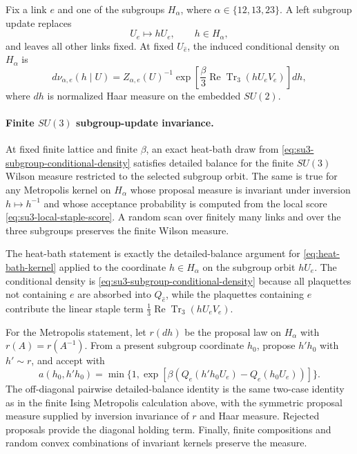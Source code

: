 Fix a link \(e\) and one of the subgroups \(H_\alpha\), where
\(\alpha\in\{12,13,23\}\).  A left subgroup update replaces
\[
  U_e\longmapsto hU_e,\qquad h\in H_\alpha,
\]
and leaves all other links fixed.  At fixed \(U_{\widehat e}\), the induced
conditional density on \(H_\alpha\) is
\begin{equation}
  d\nu_{\alpha,e}(h\mid U)
  =
  Z_{\alpha,e}(U)^{-1}
  \exp\!\left[
    \frac{\beta}{3}
    \operatorname{Re}\operatorname{Tr}_3(hU_eV_e)
  \right]dh,
  \label{eq:su3-subgroup-conditional-density}
\end{equation}
where \(dh\) is normalized Haar measure on the embedded \(SU(2)\).

\paragraph{Finite \(SU(3)\) subgroup-update invariance.}
At fixed finite lattice and finite \(\beta\), an exact heat-bath draw from
\eqref{eq:su3-subgroup-conditional-density} satisfies detailed balance for the
finite \(SU(3)\) Wilson measure restricted to the selected subgroup orbit.
The same is true for any Metropolis kernel on \(H_\alpha\) whose proposal
measure is invariant under inversion \(h\mapsto h^{-1}\) and whose acceptance
probability is computed from the local score
\eqref{eq:su3-local-staple-score}.  A random scan over finitely many links and
over the three subgroups preserves the finite Wilson measure.

The heat-bath statement is exactly the detailed-balance argument for
\eqref{eq:heat-bath-kernel} applied to the coordinate \(h\in H_\alpha\) on
the subgroup orbit \(hU_e\).  The conditional
density is \eqref{eq:su3-subgroup-conditional-density} because all plaquettes
not containing \(e\) are absorbed into \(Q_{\widehat e}\), while the plaquettes
containing \(e\) contribute the linear staple term
\(\frac13\operatorname{Re}\operatorname{Tr}_3(hU_eV_e)\).

For the Metropolis statement, let \(r(dh)\) be the proposal law on \(H_\alpha\)
with \(r(A)=r(A^{-1})\).  From a present subgroup coordinate \(h_0\), propose
\(h'h_0\) with \(h'\sim r\), and accept with
\[
  a(h_0,h'h_0)
  =
  \min\{1,\exp[\beta(Q_e(h'h_0U_e)-Q_e(h_0U_e))]\}.
\]
The off-diagonal pairwise detailed-balance identity is the same two-case
identity as in the finite Ising Metropolis calculation above, with the
symmetric proposal measure supplied by inversion invariance of \(r\) and Haar
measure.  Rejected proposals provide the diagonal holding term.  Finally,
finite compositions and random convex combinations of invariant kernels
preserve the measure.

